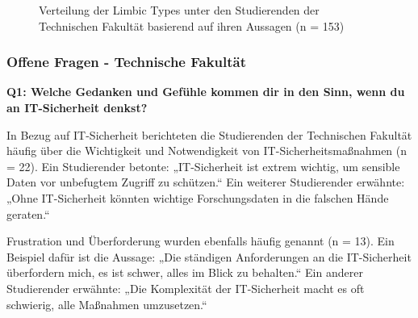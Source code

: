\documentclass[german,report]{i1thesis}
\begin{document}
\begin{figure}[H]
\centering
{}
\caption{Verteilung der Limbic Types \cite{hausel2011wissenschaftliche} unter den Studierenden der Technischen Fakultät basierend auf ihren Aussagen (n = 153)}
\label{fig:limbic_types}
\end{figure}

\subsubsection{Offene Fragen - Technische Fakultät}

\textbf{Q1: Welche Gedanken und Gefühle kommen dir in den Sinn, wenn du an IT-Sicherheit denkst?}

In Bezug auf IT-Sicherheit berichteten die Studierenden der Technischen Fakultät häufig über die Wichtigkeit und Notwendigkeit von IT-Sicherheitsmaßnahmen (n = 22). Ein Studierender betonte: „IT-Sicherheit ist extrem wichtig, um sensible Daten vor unbefugtem Zugriff zu schützen.“ Ein weiterer Studierender erwähnte: „Ohne IT-Sicherheit könnten wichtige Forschungsdaten in die falschen Hände geraten.“

Frustration und Überforderung wurden ebenfalls häufig genannt (n = 13). Ein Beispiel dafür ist die Aussage: „Die ständigen Anforderungen an die IT-Sicherheit überfordern mich, es ist schwer, alles im Blick zu behalten.“ Ein anderer Studierender erwähnte: „Die Komplexität der IT-Sicherheit macht es oft schwierig, alle Maßnahmen umzusetzen.“
\end{document}
